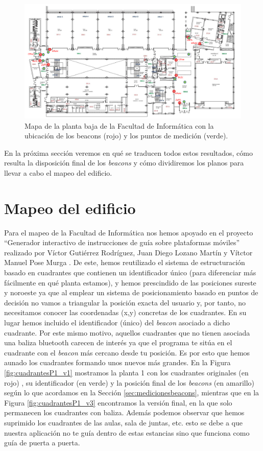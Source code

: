 \begin{figure}[t]
	\centering
	\includegraphics[width=1\textwidth]{Imagenes/Descripciondeltrabajo/medidasPlanoPBaja}
	\caption{Mapa de la planta baja de la Facultad de Informática con la ubicación de los beacons (rojo) y los puntos de medición (verde). }
	\label{fig:medidasPBaja}
\end{figure}

En la próxima sección veremos en qué se traducen todos estos resultados, cómo resulta la disposición final de los \textit{beacons} y cómo dividiremos los planos para llevar a cabo el mapeo del edificio.


\section{Mapeo del edificio}
\label{sec:mapeo}
Para el mapeo de la Facultad de Informática nos hemos apoyado en el proyecto ``Generador interactivo de instrucciones de guía sobre plataformas móviles'' realizado por Víctor Gutiérrez Rodríguez, Juan Diego Lozano Martín y Vítctor Manuel Pose Murga \citep{TFGguia}. De este, hemos reutilizado el sistema de estructuración basado en cuadrantes que contienen un identificador único (para diferenciar más fácilmente en qué planta estamos), y hemos prescindido de las posiciones sureste y noroeste ya que al emplear un sistema de posicionamiento basado en puntos de decisión no vamos a triangular la posición exacta del usuario y, por tanto, no necesitamos conocer las coordenadas (x,y) concretas de los cuadrantes. En su lugar hemos incluido el identificador (único) del \textit{beacon} asociado a dicho cuadrante. Por este mismo motivo, aquellos cuadrantes que no tienen asociada una baliza bluetooth carecen de interés ya que el programa te sitúa en el cuadrante con el \textit{beacon} más cercano desde tu posición. Es por esto que hemos aunado los cuadrantes formando unos nuevos más grandes. En la Figura \ref{fig:cuadrantesP1_v1} mostramos la planta 1 con los cuadrantes originales (en rojo) , su identificador (en verde) y la posición final de los \textit{beacons} (en amarillo) según lo que acordamos en la Sección \ref{sec:medicionesbeacons}, mientras que en la Figura \ref{fig:cuadrantesP1_v3} encontramos la versión final, en la que solo permanecen los cuadrantes con baliza. Además podemos observar que hemos suprimido los cuadrantes de las aulas, sala de juntas, etc. esto se debe a que nuestra aplicación no te guía dentro de estas estancias sino que funciona como guía de puerta a puerta.

